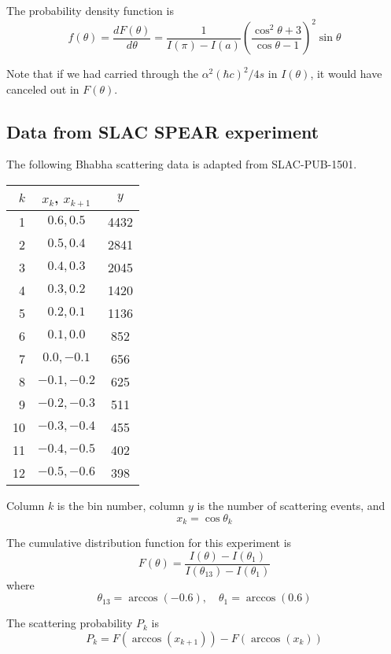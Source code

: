 \documentclass[12pt]{article}
\begin{document}
The probability density function is
$$
f(\theta)=\frac{dF(\theta)}{d\theta}
=\frac{1}{I(\pi)-I(a)}
\left(\frac{\cos^2\theta+3}{\cos\theta-1}\right)^2
\sin\theta
$$

Note that if we had carried through the $\alpha^2(\hbar c)^2/4s$ in $I(\theta)$,
it would have canceled out in $F(\theta)$.

\subsection*{Data from SLAC SPEAR experiment}
The following Bhabha scattering data is adapted from SLAC-PUB-1501.

\begin{center}
\begin{tabular}{|r|c|c|}
\hline
$k$ & $x_k$, $x_{k+1}$ & $y$\\
\hline
1 & $0.6, 0.5$ & 4432\\
2 & $0.5, 0.4$ & 2841\\
3 & $0.4, 0.3$ & 2045\\
4 & $0.3, 0.2$ & 1420\\
5 & $0.2, 0.1$ & 1136\\
6 & $0.1, 0.0$ & 852\\
7 & $0.0, -0.1$ & 656\\
8 & $-0.1, -0.2$ & 625\\
9 & $-0.2, -0.3$ & 511\\
10 & $-0.3, -0.4$ & 455\\
11 & $-0.4, -0.5$ & 402\\
12 & $-0.5, -0.6$ & 398\\
\hline
\end{tabular}
\end{center}

Column $k$ is the bin number, column $y$ is the number of scattering events, and
\begin{equation*}
x_k=\cos\theta_k
\end{equation*}

The cumulative distribution function for this experiment is
\begin{equation*}
F(\theta)=\frac{I(\theta)-I(\theta_1)}
{I(\theta_{13})-I(\theta_1)}
\end{equation*}
where
\begin{equation*}
\theta_{13}=\arccos(-0.6),
\quad
\theta_1=\arccos(0.6)
\end{equation*}

The scattering probability $P_k$ is
\begin{equation*}
P_k=F\left(\arccos(x_{k+1})\right)-F\left(\arccos(x_k)\right)
\end{equation*}
\end{document}
